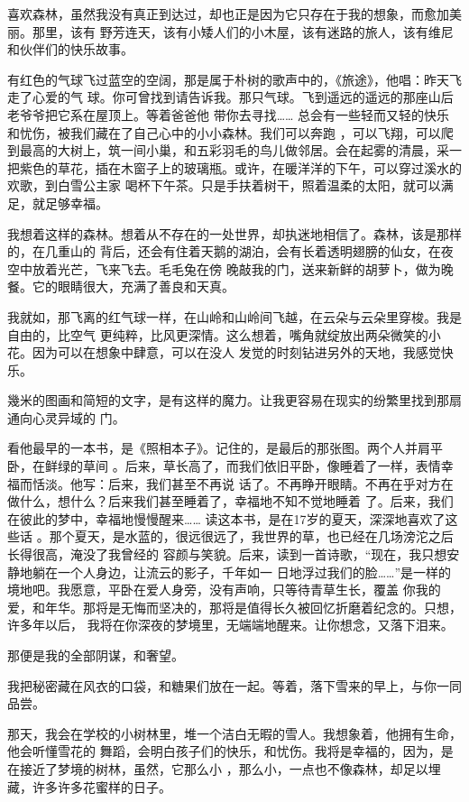 \documentclass[12pt,a4paper]{article}
\begin{document}
		喜欢森林，虽然我没有真正到达过，却也正是因为它只存在于我的想象，而愈加美丽。那里，该有
	野芳连天，该有小矮人们的小木屋，该有迷路的旅人，该有维尼和伙伴们的快乐故事。

		有红色的气球飞过蓝空的空阔，那是属于朴树的歌声中的，《旅途》，他唱：昨天飞走了心爱的气
	球。你可曾找到请告诉我。那只气球。飞到遥远的遥远的那座山后老爷爷把它系在屋顶上。等着爸爸他
	带你去寻找…… 总会有一些轻而又轻的快乐和忧伤，被我们藏在了自己心中的小小森林。我们可以奔跑
	，可以飞翔，可以爬到最高的大树上，筑一间小巢，和五彩羽毛的鸟儿做邻居。会在起雾的清晨，采一
	把紫色的草花，插在木窗子上的玻璃瓶。或许，在暖洋洋的下午，可以穿过溪水的欢歌，到白雪公主家
	喝杯下午茶。只是手扶着树干，照着温柔的太阳，就可以满足，就足够幸福。

		我想着这样的森林。想着从不存在的一处世界，却执迷地相信了。森林，该是那样的，在几重山的
	背后，还会有住着天鹅的湖泊，会有长着透明翅膀的仙女，在夜空中放着光芒，飞来飞去。毛毛兔在傍
	晚敲我的门，送来新鲜的胡萝卜，做为晚餐。它的眼睛很大，充满了善良和天真。

		我就如，那飞离的红气球一样，在山岭和山岭间飞越，在云朵与云朵里穿梭。我是自由的，比空气
	更纯粹，比风更深情。这么想着，嘴角就绽放出两朵微笑的小花。因为可以在想象中肆意，可以在没人
	发觉的时刻钻进另外的天地，我感觉快乐。

		幾米的图画和简短的文字，是有这样的魔力。让我更容易在现实的纷繁里找到那扇通向心灵异域的
	门。

		看他最早的一本书，是《照相本子》。记住的，是最后的那张图。两个人并肩平卧，在鲜绿的草间
	。后来，草长高了，而我们依旧平卧，像睡着了一样，表情幸福而恬淡。他写：后来，我们甚至不再说
	话了。不再睁开眼睛。不再在乎对方在做什么，想什么？后来我们甚至睡着了，幸福地不知不觉地睡着
	了。后来，我们在彼此的梦中，幸福地慢慢醒来…… 读这本书，是在17岁的夏天，深深地喜欢了这些话
	。那个夏天，是水蓝的，很远很远了，我世界的草，也已经在几场滂沱之后长得很高，淹没了我曾经的
	容颜与笑貌。后来，读到一首诗歌，“现在，我只想安静地躺在一个人身边，让流云的影子，千年如一
	日地浮过我们的脸……”是一样的境地吧。我愿意，平卧在爱人身旁，没有声响，只等待青草生长，覆盖
	你我的爱，和年华。那将是无悔而坚决的，那将是值得长久被回忆折磨着纪念的。只想，许多年以后，
	我将在你深夜的梦境里，无端端地醒来。让你想念，又落下泪来。

		那便是我的全部阴谋，和奢望。

		我把秘密藏在风衣的口袋，和糖果们放在一起。等着，落下雪来的早上，与你一同品尝。

		那天，我会在学校的小树林里，堆一个洁白无暇的雪人。我想象着，他拥有生命，他会听懂雪花的
	舞蹈，会明白孩子们的快乐，和忧伤。我将是幸福的，因为，是在接近了梦境的树林，虽然，它那么小
	，那么小，一点也不像森林，却足以埋藏，许多许多花蜜样的日子。
\end{document}
